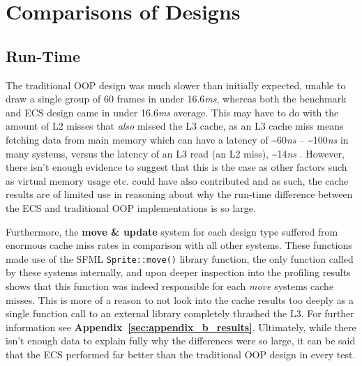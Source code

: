 \documentclass[10pt]{scrartcl}
\begin{document}

\section{Comparisons of Designs} %
\label{sec:comparisons_of_designs}

\subsection{Run-Time} %
\label{sub:run_time}
The traditional OOP design was much slower than initially expected, unable to draw a single group of 60 frames in under 16.6\textit{ms}, whereas both the benchmark and ECS design came in under 16.6\textit{ms} average. This may have to do with the amount of L2 misses that \textit{also} missed the L3 cache, as an L3 cache miss means fetching data from main memory which can have a latency of \textasciitilde60\textit{ns} -- \textasciitilde100\textit{ns} in many systems, versus the latency of an L3 read (an L2 miss), \textasciitilde14\textit{ns} \parencite[22]{intel}. However, there isn't enough evidence to suggest that this is the case as other factors such as virtual memory usage etc. could have also contributed and as such, the cache results are of limited use in reasoning about why the run-time difference between the ECS and traditional OOP implementations is so large.

Furthermore, the \textbf{move \& update} system for each design type suffered from enormous cache miss rates in comparison with all other systems. These functions made use of the SFML \texttt{Sprite::move()} library function, the only function called by these systems internally, and upon deeper inspection into the profiling results shows that this function was indeed responsible for each \textit{move} systems cache misses. This is more of a reason to not look into the cache results too deeply as a single function call to an external library completely thrashed the L3. For further information see \textbf{Appendix~\ref{sec:appendix_b_results}}. Ultimately, while there isn't enough data to explain fully why the differences were so large, it can be said that the ECS performed far better than the traditional OOP design in every test.
\end{document}
